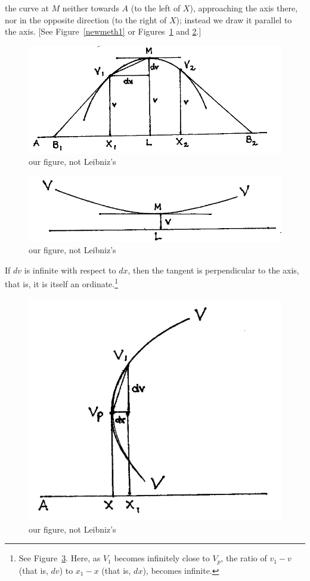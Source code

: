 \documentclass[twoside,openright]{article}
\begin{document}
the curve at $M$ neither towards $A$ (to the left of $X$), approaching
the axis there, nor in the opposite direction (to the right of $X$);
instead we draw it parallel to the axis. [See Figure~\ref{newmeth1} or
Figures~\ref{maxfig} and \ref{minfig}.]
\begin{figure}[htp]
  \begin{center}
    \includegraphics[width=.75\textwidth]{fig/Figure5}
    \caption{our figure, not Leibniz's}
    \label{maxfig}
  \end{center}
\end{figure}
\begin{figure}[htp]
  \begin{center}
    \includegraphics[width=.75\textwidth]{fig/Figure5A}
    \caption{our figure, not Leibniz's}
    \label{minfig}
  \end{center}
\end{figure}
If $dv$ is infinite with respect to $dx$, then the tangent is
perpendicular to the axis, that is, it is itself an
ordinate.\footnote{See Figure~\ref{verttang}.  Here, as $V_1$ becomes
  infinitely close to $V_p$, the ratio of $v_1 - v$ (that is, $dv$) to
  $x_1 - x$ (that is, $dx$), becomes infinite.}
\begin{figure}[htp]
  \begin{center}
    \includegraphics[width=.65\textwidth]{fig/Figure6}
    \caption{our figure, not Leibniz's}
    \label{verttang}
  \end{center}
\end{figure}
\end{document}
